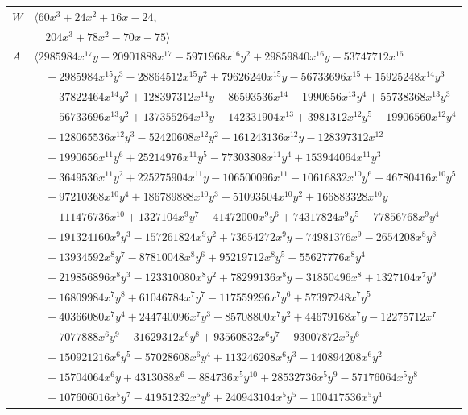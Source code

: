 \documentclass[11pt]{article}
\begin{document}
\begin{longtable}{@{}ll@{}}
$W$ & $\langle 60x^{3}+24x^{2}+16x-24,$\\
 & $\quad 204x^{3}+78x^{2}-70x-75\rangle$\\
$A$ & $\langle 2985984x^{17}y-20901888x^{17}-5971968x^{16}y^{2}+29859840x^{16}y-53747712x^{16}$\\
 & $\quad +2985984x^{15}y^{3}-28864512x^{15}y^{2}+79626240x^{15}y-56733696x^{15}+15925248x^{14}y^{3}$\\
 & $\quad -37822464x^{14}y^{2}+128397312x^{14}y-86593536x^{14}-1990656x^{13}y^{4}+55738368x^{13}y^{3}$\\
 & $\quad -56733696x^{13}y^{2}+137355264x^{13}y-142331904x^{13}+3981312x^{12}y^{5}-19906560x^{12}y^{4}$\\
 & $\quad +128065536x^{12}y^{3}-52420608x^{12}y^{2}+161243136x^{12}y-128397312x^{12}$\\
 & $\quad -1990656x^{11}y^{6}+25214976x^{11}y^{5}-77303808x^{11}y^{4}+153944064x^{11}y^{3}$\\
 & $\quad +3649536x^{11}y^{2}+225275904x^{11}y-106500096x^{11}-10616832x^{10}y^{6}+46780416x^{10}y^{5}$\\
 & $\quad -97210368x^{10}y^{4}+186789888x^{10}y^{3}-51093504x^{10}y^{2}+166883328x^{10}y$\\
 & $\quad -111476736x^{10}+1327104x^{9}y^{7}-41472000x^{9}y^{6}+74317824x^{9}y^{5}-77856768x^{9}y^{4}$\\
 & $\quad +191324160x^{9}y^{3}-157261824x^{9}y^{2}+73654272x^{9}y-74981376x^{9}-2654208x^{8}y^{8}$\\
 & $\quad +13934592x^{8}y^{7}-87810048x^{8}y^{6}+95219712x^{8}y^{5}-55627776x^{8}y^{4}$\\
 & $\quad +219856896x^{8}y^{3}-123310080x^{8}y^{2}+78299136x^{8}y-31850496x^{8}+1327104x^{7}y^{9}$\\
 & $\quad -16809984x^{7}y^{8}+61046784x^{7}y^{7}-117559296x^{7}y^{6}+57397248x^{7}y^{5}$\\
 & $\quad -40366080x^{7}y^{4}+244740096x^{7}y^{3}-85708800x^{7}y^{2}+44679168x^{7}y-12275712x^{7}$\\
 & $\quad +7077888x^{6}y^{9}-31629312x^{6}y^{8}+93560832x^{6}y^{7}-93007872x^{6}y^{6}$\\
 & $\quad +150921216x^{6}y^{5}-57028608x^{6}y^{4}+113246208x^{6}y^{3}-140894208x^{6}y^{2}$\\
 & $\quad -15704064x^{6}y+4313088x^{6}-884736x^{5}y^{10}+28532736x^{5}y^{9}-57176064x^{5}y^{8}$\\
 & $\quad +107606016x^{5}y^{7}-41951232x^{5}y^{6}+240943104x^{5}y^{5}-100417536x^{5}y^{4}$\\

\end{longtable}
\end{document}
